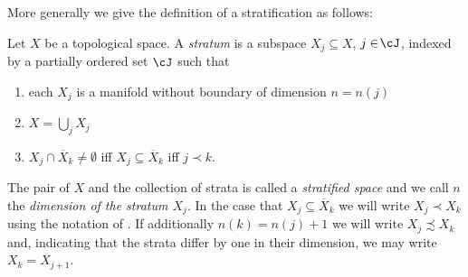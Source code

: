 More generally we give the definition of a stratification as follows:
\begin{definition}\label{df:stratified_space}
  Let $X$ be a topological space. A \emph{stratum} is a subspace $X_j\subseteq X$, $j\in\!\cJ$, indexed by a partially ordered set $\cJ$ such that
  \begin{enumerate}
    \item each $X_j$ is a manifold without boundary of dimension $n=n(j)$
    \item $X=\bigcup_jX_j$
    \item $X_j\cap \overline{X}_k\neq\emptyset$ iff $X_j\subseteq\overline{X}_k$ iff $j\prec k$.
  \end{enumerate}
  The pair of $X$ and the collection of strata is called a \emph{stratified space} and we call
  $n$ the \emph{dimension of the stratum $X_j$}.
  In the case that $X_j\subseteq\overline{X}_k$ 
  we will write $X_j\prec X_k$ using the notation of \cite{Handron2002}.
  If additionally $n(k)=n(j)+1$ we will
  write $X_j\precsim X_k$ and, indicating that the strata differ by one in their dimension, we may write $X_k=X_{j+1}$.
\end{definition}

